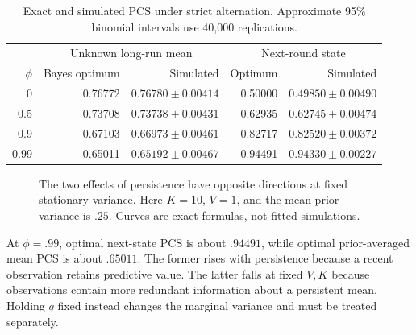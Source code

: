 \begin{table}[htbp]
\centering
\caption{Exact and simulated PCS under strict alternation. Approximate 95\% binomial intervals use 40,000 replications.}
\label{two_arm_ar1:tab:simulation}
\small
\begin{tabular}{rrrrr}
\toprule
& \multicolumn{2}{c}{Unknown long-run mean} & \multicolumn{2}{c}{Next-round state}\\
$\phi$ & Bayes optimum & Simulated & Optimum & Simulated\\
\midrule

0 & 0.76772 & $0.76780 \pm 0.00414$ & 0.50000 & $0.49850 \pm 0.00490$ \\
0.5 & 0.73708 & $0.73738 \pm 0.00431$ & 0.62935 & $0.62745 \pm 0.00474$ \\
0.9 & 0.67103 & $0.66973 \pm 0.00461$ & 0.82717 & $0.82520 \pm 0.00372$ \\
0.99 & 0.65011 & $0.65192 \pm 0.00467$ & 0.94491 & $0.94330 \pm 0.00227$ \\


\bottomrule
\end{tabular}
\end{table}

\begin{figure}[htbp]
\centering
{}
\caption{The two effects of persistence have opposite directions at fixed stationary variance. Here $K=10$, $V=1$, and the mean prior variance is $.25$. Curves are exact formulas, not fitted simulations.}
\label{two_arm_ar1:fig:pcs}
\end{figure}

At $\phi=.99$, optimal next-state PCS is about $.94491$, while optimal prior-averaged mean PCS is about $.65011$. The former rises with persistence because a recent observation retains predictive value. The latter falls at fixed $V,K$ because observations contain more redundant information about a persistent mean. Holding $q$ fixed instead changes the marginal variance and must be treated separately.

